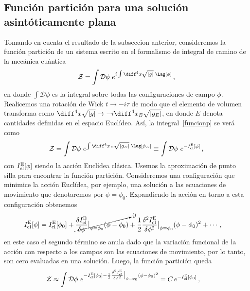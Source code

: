 \documentclass[../Main.tex]{subfiles}
\begin{document}
\subsection{Función partición para una solución asintóticamente plana} \label{funcionparticion}

Tomando en cuenta el resultado de la subseccion anterior, consideremos la función partición de un sistema escrito en el formalismo de integral de camino de la mecánica cuántica
\begin{align}
     \mathcal{Z}=\int \mathcal{D}\phi \,\, e^{i\int \diff^4 x \sqrt{\lvert g \lvert} \;\Lag[\phi]}\, ,\label{funcionp}
\end{align}
en donde $\int \mathcal{D}\phi$ es la integral sobre todas las configuraciones de campo $\phi$. Realicemos una rotación de Wick $t\to -i\tau$ de modo que el elemento de volumen transforma como $\diff^4 x \sqrt{\lvert g \lvert}\to -i\diff^4 x_{E}\sqrt{\lvert g_{E} \lvert}$, en donde $E$ denota cantidades definidas en el espacio Euclídeo. Así, la integral~\eqref{funcionp} se verá como
\begin{align}
    \mathcal{Z}=\int \mathcal{D}\phi \,\, e^{\int \diff^4 x_{E} \sqrt{\lvert g_{E} \lvert} \;\Lag[\phi_{E}]}\equiv\int \mathcal{D}\phi \,\, e^{-I^{\rm E}_{\rm cl}[\phi]}\, ,
\end{align}
con $I^{\rm E}_{\rm cl}[\phi]$ siendo la acción Euclídea clásica. Usemos la aproximación de punto silla para encontrar la función partición. Consideremos una configuración que minimice la acción Euclídea, por ejemplo, una solución a las ecuaciones de movimiento que denotaremos por $\phi=\phi_{0}$. Expandiendo la acción en torno a esta configuración obtenemos  
\begin{align}
    I^{\rm E}_{\rm cl}[\phi]&=I^{\rm E}_{\rm cl}[\phi_{0}]+\cancelto{0}{\frac{\delta I^{\rm E}_{\rm cl}}{\delta\phi}\big|_{\phi=\phi_{0}}(\phi-\phi_{0})}+\frac{1}{2}\frac{\delta^{2} I^{\rm E}_{\rm cl}}{\delta\phi^{2}}\big|_{\phi=\phi_{0}}(\phi-\phi_{0})^{2}+\cdots\, ,
\end{align}
en este caso el segundo término se anula dado que la variación funcional de la acción con respecto a los campos son las ecuaciones de movimiento, por lo tanto, son cero evaluadas en una solución. Luego, la función partición queda 
\begin{align}
    \mathcal{Z}&\approx \int \mathcal{D}\phi \,\, e^{-I^{\rm E}_{\rm cl}[\phi_{0}]-\frac{1}{2}\frac{\delta^{2} I^{\rm E}_{\rm cl}}{\delta\phi^{2}}\big|_{\phi=\phi_{0}}(\phi-\phi_{0})^{2}}=C\, e^{-I^{\rm E}_{\rm cl}[\phi_{0}]}\, ,
\end{align}
\end{document}
